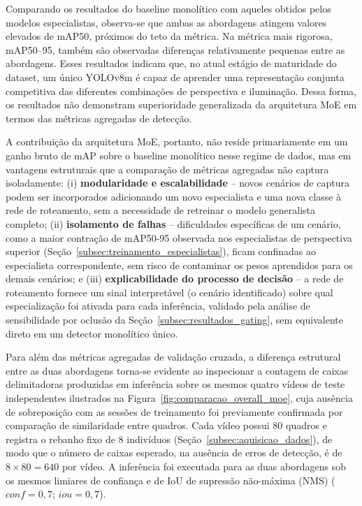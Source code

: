 \documentclass[12pt,fleqn]{article}
\begin{document}
Comparando os resultados do baseline monolítico com aqueles obtidos pelos modelos especialistas, observa-se que ambas as abordagens atingem valores elevados de mAP50, próximos do teto da métrica. Na métrica mais rigorosa, mAP50--95, também são observadas diferenças relativamente pequenas entre as abordagens. Esses resultados indicam que, no atual estágio de maturidade do dataset, um único YOLOv8m é capaz de aprender uma
representação conjunta competitiva das diferentes combinações de perspectiva e iluminação. Dessa forma, os resultados não demonstram superioridade generalizada da arquitetura MoE em termos das métricas agregadas de detecção.

A contribuição da arquitetura MoE, portanto, não reside primariamente em um ganho bruto de mAP sobre o baseline monolítico nesse regime de dados, mas em vantagens estruturais que a comparação de métricas agregadas não captura isoladamente: (i) \textbf{modularidade e escalabilidade} -- novos cenários de captura podem ser incorporados adicionando um novo especialista e uma nova classe à rede de roteamento, sem a necessidade de retreinar o modelo generalista completo; (ii) \textbf{isolamento de falhas} -- dificuldades específicas de um cenário, como a maior contração de mAP50-95 observada nos especialistas de perspectiva superior (Seção~\ref{subsec:treinamento_especialistas}), ficam confinadas ao especialista correspondente, sem risco de contaminar os pesos aprendidos para os demais cenários; e (iii) \textbf{explicabilidade do processo de decisão} -- a rede de roteamento fornece um sinal interpretável (o cenário identificado) sobre qual especialização foi ativada para cada inferência, validado pela análise de sensibilidade por oclusão da Seção~\ref{subsec:resultados_gating}, sem equivalente direto em um detector monolítico único.

Para além das métricas agregadas de validação cruzada, a diferença estrutural entre as duas abordagens torna-se evidente ao inspecionar a contagem de caixas delimitadoras produzidas em inferência sobre os mesmos quatro vídeos de teste independentes ilustrados na Figura~\ref{fig:comparacao_overall_moe}, cuja ausência de sobreposição com as sessões de treinamento foi previamente confirmada por comparação de similaridade entre quadros. Cada vídeo possui 80 quadros e registra o rebanho fixo de 8 indivíduos (Seção~\ref{subsec:aquisicao_dados}), de modo que o número de caixas esperado, na ausência de erros de detecção, é de $8 \times 80 = 640$ por vídeo. A inferência foi executada para as duas abordagens sob os mesmos limiares de confiança e de IoU de supressão não-máxima (NMS) ($conf=0{,}7$; $iou=0{,}7$).
\end{document}
